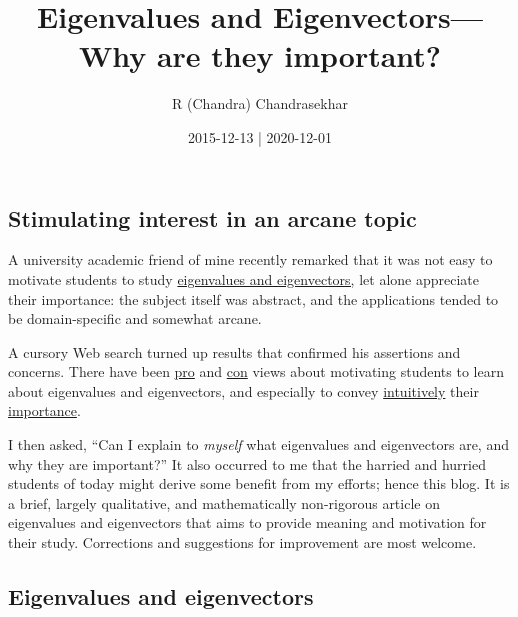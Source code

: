 \documentclass[
  12pt,
  a4paper,
]{article}
\title{Eigenvalues and Eigenvectors---Why are they important?}
\author{R (Chandra) Chandrasekhar}
\date{2015-12-13 | 2020-12-01}
\begin{document}
\maketitle

\thispagestyle{empty}


\hypertarget{stimulating-interest-in-an-arcane-topic}{%
\subsection{Stimulating interest in an arcane
topic}\label{stimulating-interest-in-an-arcane-topic}}

A university academic friend of mine recently remarked that it was not
easy to motivate students to study
\href{https://en.wikipedia.org/wiki/Eigenvalues_and_eigenvectors}{eigenvalues
and eigenvectors,} let alone appreciate their importance: the subject
itself was abstract, and the applications tended to be domain-specific
and somewhat arcane.

A cursory Web search turned up results that confirmed his assertions and
concerns. There have been
\href{http://matheducators.stackexchange.com/questions/520/what-is-a-good-motivation-showcase-for-a-student-for-the-study-of-eigenvalues}{pro}
and
\href{http://matheducators.stackexchange.com/questions/8586/too-much-motivation}{con}
views about motivating students to learn about eigenvalues and
eigenvectors, and especially to convey
\href{http://matheducators.stackexchange.com/questions/3983/what-is-the-best-way-to-intuitively-explain-what-eigenvectors-and-eigenvalues-ar}{intuitively}
their
\href{http://math.stackexchange.com/questions/23312/what-is-the-importance-of-eigenvalues-eigenvectors}{importance}.

I then asked, ``Can I explain to \emph{myself} what eigenvalues and
eigenvectors are, and why they are important?'' It also occurred to me
that the harried and hurried students of today might derive some benefit
from my efforts; hence this blog. It is a brief, largely qualitative,
and mathematically non-rigorous article on eigenvalues and eigenvectors
that aims to provide meaning and motivation for their study. Corrections
and suggestions for improvement are most welcome. 
\normalfont

\hypertarget{eigenvalues-and-eigenvectors}{%
\subsection{Eigenvalues and
eigenvectors}\label{eigenvalues-and-eigenvectors}}
\end{document}

